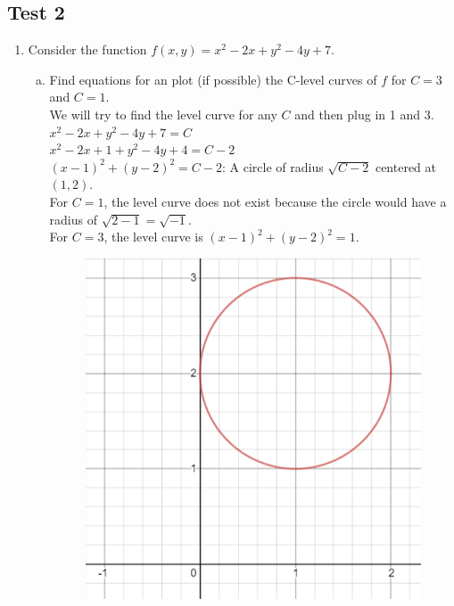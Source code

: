 \subsection{Test 2}
\begin{enumerate}
	\item Consider the function $f(x,y) = x^2-2x+y^2-4y+7$.\\
	\begin{enumerate}[a.]
		\item Find equations for an plot (if possible) the C-level curves of $f$ for $C=3$ and $C=1$.\\
		\indent
		We will try to find the level curve for any $C$ and then plug in 1 and 3.\\
		$x^2-2x+y^2-4y+7=C$\\
		$x^2-2x+1+y^2-4y+4=C-2$\\
		$(x-1)^2+(y-2)^2=C-2$: A circle of radius $\sqrt{C-2}$ centered at $(1,2)$.\\
		For $C=1$, the level curve does not exist because the circle would have a radius of $\sqrt{2-1}=\sqrt{-1}$.\\
		For $C=3$, the level curve is $(x-1)^2+(y-2)^2=1$.
		
		\begin{figure}[h]
			\centering
			\includegraphics[scale=.24]{Images/additionalMaterials/test2_circle}
		\end{figure}
		

\end{enumerate}
\end{enumerate}

